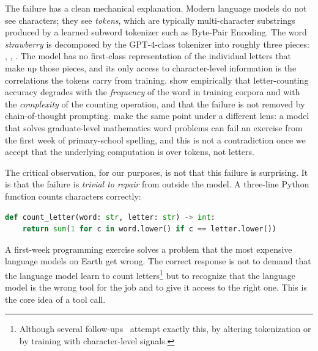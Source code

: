 The failure has a clean mechanical explanation. Modern language
models do not see characters; they see \emph{tokens}, which are
typically multi-character substrings produced by a learned subword
tokenizer such as Byte-Pair Encoding. The word \emph{strawberry} is
decomposed by the GPT-4-class tokenizer into roughly three pieces:
, , . The model has no first-class
representation of the individual letters that make up those pieces,
and its only access to character-level information is the
correlations the tokens carry from training. \citet{fu2024counting}
show empirically that letter-counting accuracy degrades with the
\emph{frequency} of the word in training corpora and with the
\emph{complexity} of the counting operation, and that the failure is
not removed by chain-of-thought prompting. \citet{xu2024geniusparadox}
make the same point under a different lens: a model that solves
graduate-level mathematics word problems can fail an exercise from
the first week of primary-school spelling, and this is not a
contradiction once we accept that the underlying computation is over
tokens, not letters.

The critical observation, for our purposes, is not that this failure
is surprising. It is that the failure is \emph{trivial to repair} from
outside the model. A three-line Python function counts characters
correctly:

\begin{lstlisting}[language=Python,caption={A reliable letter counter.},label=lst:counter]
def count_letter(word: str, letter: str) -> int:
    return sum(1 for c in word.lower() if c == letter.lower())
\end{lstlisting}

\noindent
A first-week programming exercise solves a problem that the most
expensive language models on Earth get wrong. The correct response
is not to demand that the language model learn to count
letters\footnote{Although several follow-ups~\citep{xu2024geniusparadox}
attempt exactly this, by altering tokenization or by training with
character-level signals.} but to recognize that the language model is
the wrong tool for the job and to give it access to the right one.
This is the core idea of a tool call.

